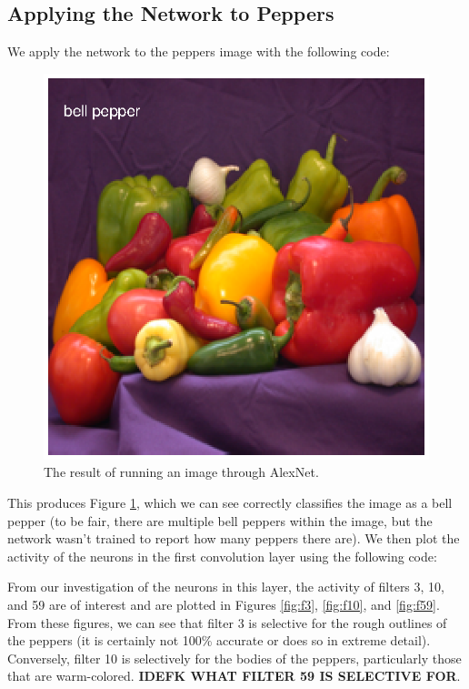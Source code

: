\documentclass[11pt, oneside]{article}
\begin{document}
\subsection{Applying the Network to Peppers}

We apply the network to the peppers image with the following code:


\begin{figure}[ht!]
\includegraphics[width=1\textwidth]{pepper_classify.eps}
\caption{The result of running an image through AlexNet.}
\label{fig:pepClassified}
\end{figure}

This produces Figure \ref{fig:pepClassified}, which we can see correctly classifies the image as a bell pepper (to be fair, there are multiple bell peppers within the image, but the network wasn't trained to report how many peppers there are). We then plot the activity of the neurons in the first convolution layer using the following code:


From our investigation of the neurons in this layer, the activity of filters 3, 10, and 59 are of interest and are plotted in Figures \ref{fig:f3}, \ref{fig:f10}, and \ref{fig:f59}. From these figures, we can see that filter 3 is selective for the rough outlines of the peppers (it is certainly not 100\% accurate or does so in extreme detail). Conversely, filter 10 is selectively for the bodies of the peppers, particularly those that are warm-colored. \textbf{IDEFK WHAT FILTER 59 IS SELECTIVE FOR}.
\end{document}
